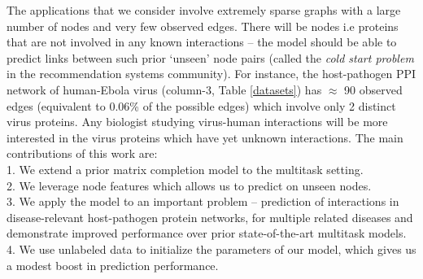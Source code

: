 \documentclass[runningheads,a4paper]{llncs}
\begin{document}
The applications that we consider involve extremely sparse graphs with a large number of nodes and very few observed edges. There will be nodes i.e proteins that are not involved in any known interactions -- the model should be able to predict links between such prior `unseen' node pairs (called the \textit{cold start problem} in the recommendation systems community). 
For instance, the host-pathogen PPI network of human-Ebola virus (column-3, Table \ref{datasets}) has $\approx$ 90 observed edges (equivalent to 0.06\% of the possible edges) which involve only 2 distinct virus proteins. Any biologist studying virus-human interactions will be more interested in the virus proteins which have yet unknown interactions.
The main contributions of this work are:\\
1. We extend a prior matrix completion model \cite{abernethy} to the multitask setting.\\
2. We leverage node features which allows us to predict on unseen nodes.\\
3. We apply the model to an important problem -- prediction of interactions in disease-relevant host-pathogen protein networks, for multiple related diseases and demonstrate improved performance over prior state-of-the-art multitask models.\\
4. We use unlabeled data to initialize the parameters of our model, which gives us a modest boost in prediction performance.
\end{document}
